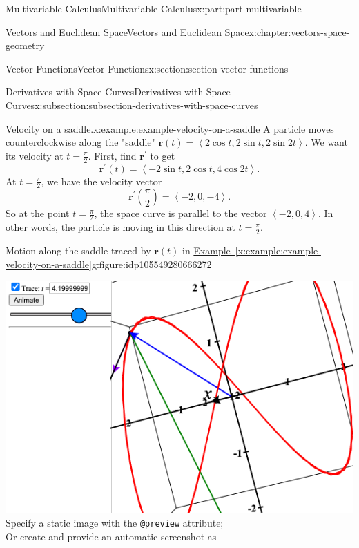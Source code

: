 \documentclass[twoside,10pt,]{book}
\newcommand{\xreffont}{\relax}
\newcommand{\mono}[1]{\texttt{#1}}
\numberwithin{equation}{part}
\newlength{\qrsize}
\newlength{\previewwidth}
\newcommand{\vb}[1]{\mathbf{#1}}
\newcommand{\dotprod}[1]{\left\langle #1 \right\rangle}
\begin{document}
\begin{partptx}{Multivariable Calculus}{}{Multivariable Calculus}{}{}{x:part:part-multivariable}
\begin{chapterptx}{Vectors and Euclidean Space}{}{Vectors and Euclidean Space}{}{}{x:chapter:vectors-space-geometry}
\begin{sectionptx}{Vector Functions}{}{Vector Functions}{}{}{x:section:section-vector-functions}
\begin{subsectionptx}{Derivatives with Space Curves}{}{Derivatives with Space Curves}{}{}{x:subsection:subsection-derivatives-with-space-curves}
\begin{example}{Velocity on a saddle.}{x:example:example-velocity-on-a-saddle}
A particle moves counterclockwise along the "saddle" \(\mathbf{r}(t) = \dotprod{2\cos t, 2\sin t, 2\sin 2t}\). We want its velocity at \(t=\frac{\pi}{2}\). First, find \(\mathbf{r}^\prime\) to get%
%
\begin{equation*}
\mathbf{r}^\prime(t) = \dotprod{-2\sin t,2\cos t,4\cos2t}.
\end{equation*}
At \(t=\frac{\pi}{2}\), we have the velocity vector%
%
\begin{equation*}
\mathbf{r}^\prime\left(\frac{\pi}{2}\right) = \dotprod{-2,0,-4}.
\end{equation*}
So at the point \(t=\frac{\pi}{2}\), the space curve is parallel to the vector \(\dotprod{-2,0,4}\). In other words, the particle is moving in this direction at \(t=\frac{\pi}{2}\).%
\end{example}
\begin{figureptx}{Motion along the saddle traced by \(\vb{r}(t)\) in \hyperref[x:example:example-velocity-on-a-saddle]{Example~{\xreffont\ref{x:example:example-velocity-on-a-saddle}}}}{g:figure:idp105549280666272}{}%
\centering
\setlength{\qrsize}{9em}
\setlength{\previewwidth}{\linewidth}
\addtolength{\previewwidth}{-\qrsize}
\begin{tcbraster}[raster columns=2, raster column skip=1pt, raster halign=center, raster force size=false, raster left skip=0pt, raster right skip=0pt]%
\begin{tcolorbox}[previewstyle, width=\previewwidth]%
%
{\includegraphics[width=0.80\linewidth,height=\qrsize,keepaspectratio]{generated/preview/calcplot3d-velocity-on-a-saddle-preview.png}}%
{\small{}Specify a static image with the \mono{@preview} attribute;\\%
Or create and provide an automatic screenshot as\\%
}
\end{tcolorbox}
\end{tcbraster}
\end{figureptx}
\end{subsectionptx}
\end{sectionptx}
\end{chapterptx}
\end{partptx}
\end{document}
